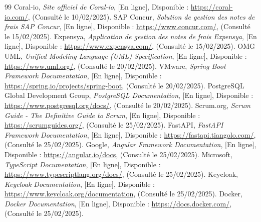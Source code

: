 \documentclass[12pt,a4paper]{report}
\begin{document}

\begin{thebibliography}{99}
 Coral-io, \textit{Site officiel de Coral-io}, [En ligne], Disponible : \url{https://coral-io.com/}, (Consulté le 10/02/2025).
 SAP Concur, \textit{Solution de gestion des notes de frais SAP Concur}, [En ligne], Disponible : \url{https://www.concur.com/}, (Consulté le 15/02/2025).
 Expensya, \textit{Application de gestion des notes de frais Expensya}, [En ligne], Disponible : \url{https://www.expensya.com/}, (Consulté le 15/02/2025).
 OMG UML, \textit{Unified Modeling Language (UML) Specification}, [En ligne], Disponible : \url{https://www.uml.org/}, (Consulté le 20/02/2025).
 VMware, \textit{Spring Boot Framework Documentation}, [En ligne], Disponible : \url{https://spring.io/projects/spring-boot}, (Consulté le 20/02/2025).
 PostgreSQL Global Development Group, \textit{PostgreSQL Documentation}, [En ligne], Disponible : \url{https://www.postgresql.org/docs/}, (Consulté le 20/02/2025).
 Scrum.org, \textit{Scrum Guide - The Definitive Guide to Scrum}, [En ligne], Disponible : \url{https://scrumguides.org/}, (Consulté le 25/02/2025).
 FastAPI, \textit{FastAPI Framework Documentation}, [En ligne], Disponible : \url{https://fastapi.tiangolo.com/}, (Consulté le 25/02/2025).
 Google, \textit{Angular Framework Documentation}, [En ligne], Disponible : \url{https://angular.io/docs}, (Consulté le 25/02/2025).
 Microsoft, \textit{TypeScript Documentation}, [En ligne], Disponible : \url{https://www.typescriptlang.org/docs/}, (Consulté le 25/02/2025).
 Keycloak, \textit{Keycloak Documentation}, [En ligne], Disponible : \url{https://www.keycloak.org/documentation}, (Consulté le 25/02/2025).
 Docker, \textit{Docker Documentation}, [En ligne], Disponible : \url{https://docs.docker.com/}, (Consulté le 25/02/2025).
\end{thebibliography}
\end{document}
